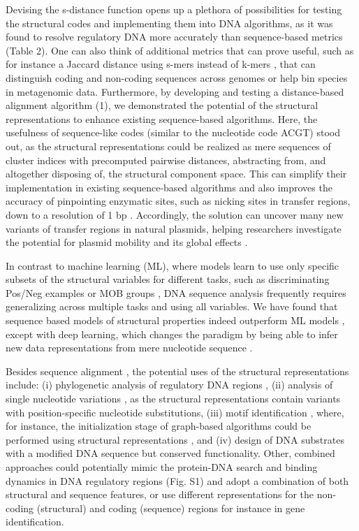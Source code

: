 \documentclass[sigconf]{acmart}
\begin{document}
Devising the s-distance function opens up a plethora of possibilities for testing the structural codes and implementing them into DNA algorithms, as it was found to resolve regulatory DNA more accurately than sequence-based metrics \cite{Zrimec2020-wx,Zrimec2018-lx} (Table 2). One can also think of additional metrics that can prove useful, such as for instance a Jaccard distance using s-mers instead of k-mers \cite{Zrimec2020-wx}, that can distinguish coding and non-coding sequences across genomes or help bin species in metagenomic data. Furthermore, by developing and testing a distance-based alignment algorithm (1), we demonstrated the potential of the structural representations to enhance existing sequence-based algorithms. Here, the usefulness of sequence-like codes (similar to the nucleotide code ACGT) stood out, as the structural representations could be realized as mere sequences of cluster indices with precomputed pairwise distances, abstracting from, and altogether disposing of, the structural component space. This can simplify their implementation in existing sequence-based algorithms and also improves the accuracy of pinpointing enzymatic sites, such as nicking sites in transfer regions, down to a resolution of 1 bp \cite{Zrimec2020-wx}. Accordingly, the solution can uncover many new variants of transfer regions in natural plasmids, helping researchers investigate the potential for plasmid mobility and its global effects \cite{Zrimec2020-wx}. 

In contrast to machine learning (ML), where models learn to use only specific subsets of the structural variables for different tasks, such as discriminating Pos/Neg examples or MOB groups \cite{Zrimec2015-xf,Zrimec2018-lx,Zrimec2013-ds}, DNA sequence analysis frequently requires generalizing across multiple tasks and using all variables. We have found that sequence based models of structural properties indeed outperform ML models \cite{Zrimec2020-wx,Zrimec2018-lx}, except with deep learning, which changes the paradigm by being able to infer new data representations from mere nucleotide sequence \cite{Zrimec2019-ql}.

Besides sequence alignment \cite{Zrimec2020-wx}, the potential uses of the structural representations include: (i) phylogenetic analysis of regulatory DNA regions \cite{Garcillan-Barcia2009-yk}, (ii) analysis of single nucleotide variations \cite{Watson2008-dt}, as the structural representations contain variants with position-specific nucleotide substitutions, (iii) motif identification \cite{Samee2019-xj}, where, for instance, the initialization stage of graph-based algorithms could be performed using structural representations \cite{Stepancic2014-yu}, and (iv) design of DNA substrates with a modified DNA sequence but conserved functionality. Other, combined approaches could potentially mimic the protein-DNA search and binding dynamics in DNA regulatory regions \cite{Marcovitz2013-kg,Levo2015-iu,Rohs2009-hm} (Fig. S1) and adopt a combination of both structural and sequence features, or use different representations for the non-coding (structural) and coding (sequence) regions for instance in gene identification.
\end{document}

